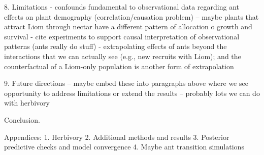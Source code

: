 \documentclass[11pt]{article}
\begin{document}
8. Limitations
- confounds fundamental to observational data regarding ant effects on plant demography (correlation/causation problem) -- maybe plants that attract Liom through nectar have a different pattern of allocation o growth and survival
- cite experiments to support causal interpretation of observational patterns (ants really do stuff)
- extrapolating effects of ants beyond the interactions that we can actually see (e.g., new recruits with Liom); and the counterfactual of a Liom-only population is another form of extrapolation

9. Future directions -- maybe embed these into paragraphs above where we see opportunity to address limitations or extend the results -- probably lots we can do with herbivory

Conclusion. 

Appendices:
1. Herbivory
2. Additional methods and results
3. Posterior predictive checks and model convergence
4. Maybe ant transition simulations
\end{document}
